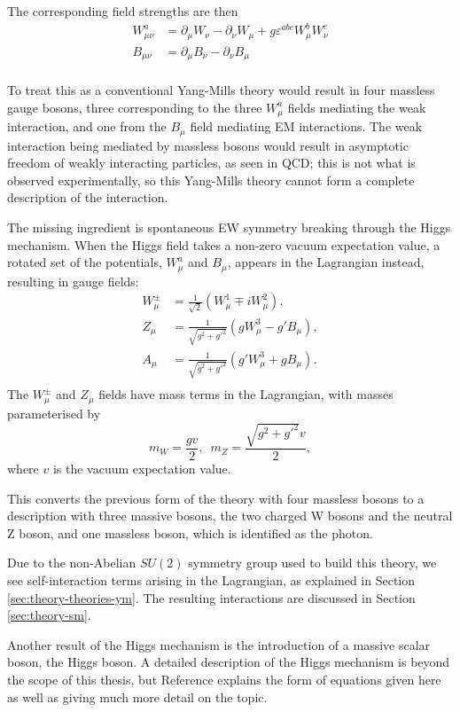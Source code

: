 The corresponding field strengths are then
\begin{equation*}
  \begin{split}
  W^a_{\mu\nu} &= \partial_\mu W_\nu - \partial_\nu W_\mu
               + g \varepsilon^{abc}W^b_\mu W^c_\nu \\
  B_{\mu\nu}   &= \partial_\mu B_\nu - \partial_\nu B_\mu \\
  \end{split}
\end{equation*}

To treat this as a conventional Yang-Mills theory would result in four massless
gauge bosons, three corresponding to the three $W^a_\mu$ fields mediating the
weak interaction, and one from the $B_\mu$ field mediating \ac{EM} interactions.
The weak interaction being mediated by massless bosons would result in
asymptotic freedom of weakly interacting particles, as seen in \ac{QCD}; this is
not what is observed experimentally, so this Yang-Mills theory cannot form a
complete description of the interaction.

The missing ingredient is  spontaneous \ac{EW} symmetry breaking through the
Higgs mechanism. When the Higgs field takes a non-zero vacuum expectation value,
a rotated set of the potentials, $W^a_\mu$ and $B_\mu$, appears in the
Lagrangian instead, resulting in gauge fields:
\begin{equation*}
  \begin{split}
    W_\mu^\pm &= \frac1{\sqrt2} (W_\mu^1 \mp iW_\mu^2), \\
    Z_\mu     &= \frac1{\sqrt{g^2 + g'^2}}( gW_\mu^3 - g' B_\mu ), \\
    A_\mu     &= \frac1{\sqrt{g^2 + g'^2}}( g'W_\mu^3 + g B_\mu ). \\
  \end{split}
\end{equation*}
%
The $W^\pm_\mu$ and $Z_\mu$ fields have mass terms in the Lagrangian, with
masses parameterised by
\begin{equation*}
  m_W = \frac{gv}2, \,\,\, m_Z = \frac{\sqrt{g^2 + g'^2}v}2,
\end{equation*}
where $v$ is the vacuum expectation value.

This converts the previous form of the theory with four massless bosons to a
description with three massive bosons, the two charged W bosons and the
neutral Z boson, and one massless boson, which is identified as the photon.

Due to the non-Abelian $SU(2)$ symmetry group used to build this theory, we
see self-interaction terms arising in the Lagrangian, as explained in Section
\ref{sec:theory-theories-ym}. The resulting interactions are discussed in
Section \ref{sec:theory-sm}.

Another result of the Higgs mechanism is the introduction of a massive scalar
boson, the Higgs boson.  A detailed description of the Higgs mechanism is beyond
the scope of this thesis, but Reference \cite{Peskin1995} explains the form of
equations given here as well as giving much more detail on the topic.
